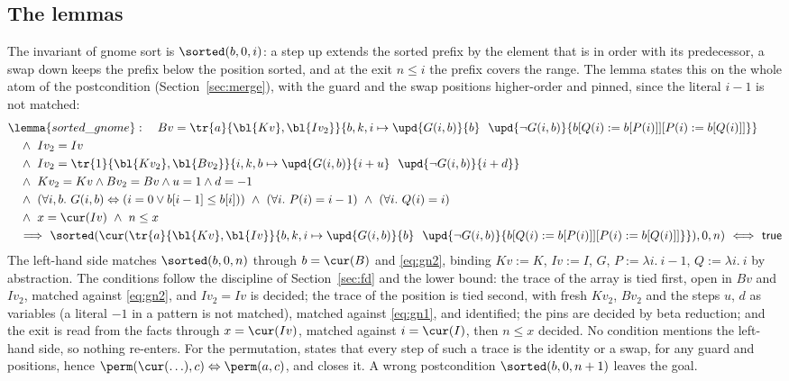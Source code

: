 \subsection{The lemmas}
The invariant of gnome sort is $\sorted(b, 0, i)$: a step up extends the sorted prefix by the element that
is in order with its predecessor, a swap down keeps the prefix below the position sorted, and at the exit
$n \le i$ the prefix covers the range. The lemma states this on the whole atom of the postcondition
(Section~\ref{sec:merge}), with the guard and the swap positions higher-order and pinned, since the literal
$i - 1$ is not matched:
\begin{align*}
  &\lemma{sorted\_gnome}:\quad Bv = \tr{a}{\bl{Kv}, \bl{Iv_2}}{b, k, i \mapsto \upd{G(i, b)}{b}\ \ \upd{\neg G(i, b)}{b[Q(i) := b[P(i)]][P(i) := b[Q(i)]]}}\\
  &\quad\wedge\ Iv_2 = Iv\\
  &\quad\wedge\ Iv_2 = \tr{1}{\bl{Kv_2}, \bl{Bv_2}}{i, k, b \mapsto \upd{G(i, b)}{i + u}\ \ \upd{\neg G(i, b)}{i + d}}\\
  &\quad\wedge\ Kv_2 = Kv \wedge Bv_2 = Bv \wedge u = 1 \wedge d = -1\\
  &\quad\wedge\ (\forall i, b.\ G(i, b) \Leftrightarrow (i = 0 \vee b[i - 1] \le b[i]))\ \wedge\ (\forall i.\ P(i) = i - 1)\ \wedge\ (\forall i.\ Q(i) = i)\\
  &\quad\wedge\ x = \cur(Iv)\ \wedge\ n \le x\\
  &\quad\Longrightarrow\ \sorted(\cur(\tr{a}{\bl{Kv}, \bl{Iv}}{b, k, i \mapsto \upd{G(i, b)}{b}\ \ \upd{\neg G(i, b)}{b[Q(i) := b[P(i)]][P(i) := b[Q(i)]]}}), 0, n)\
    \Longleftrightarrow\ \mathsf{true}
\end{align*}
The left-hand side matches $\sorted(b, 0, n)$ through $b = \cur(B)$ and \eqref{eq:gn2}, binding $Kv := K$,
$Iv := I$, $G$, $P := \lambda i.\ i - 1$, $Q := \lambda i.\ i$ by abstraction. The conditions follow the
discipline of Section~\ref{sec:fd} and the lower bound: the trace of the array is tied first, open in $Bv$
and $Iv_2$, matched against \eqref{eq:gn2}, and $Iv_2 = Iv$ is decided; the trace of the position is tied
second, with fresh $Kv_2$, $Bv_2$ and the steps $u$, $d$ as variables (a literal $-1$ in a pattern is not
matched), matched against \eqref{eq:gn1}, and identified; the pins are decided by beta reduction; and the
exit is read from the facts through $x = \cur(Iv)$, matched against $i = \cur(I)$, then $n \le x$ decided.
No condition mentions the left-hand side, so nothing re-enters. For the permutation, \lemma{perm\_gnome}
states that every step of such a trace is the identity or a swap, for any guard and positions, hence
$\perm(\cur(\ldots), c) \Leftrightarrow \perm(a, c)$, and \lemma{perm\_refl} closes it. A wrong postcondition
$\sorted(b, 0, n + 1)$ leaves the goal.

